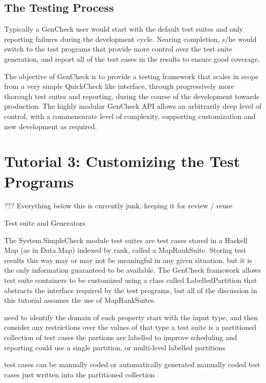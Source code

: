 

\subsection{The Testing Process}
Typically a GenCheck user would start with the default test suites
and only reporting failures during the development cycle.
Nearing completion, s/he would switch to the test programs 
that provide more control over the test suite generation,
and report all of the test cases in the results to ensure good coverage.

The objective of GenCheck is to provide a testing framework that
scales in scope from a very simple QuickCheck like interface,
through progressively more thorough test suites and reporting,
during the course of the development towards production.
The highly modular GenCheck API allows an arbitrarily deep level of control,
with a commensurate level of complexity,
supporting customization and new development as required.




\section{Tutorial 3: Customizing the Test Programs}

??? Everything below this is currently junk, keeping it for review / reuse

Test suite and Generators

The System.SimpleCheck module test suites are test cases stored in 
a Haskell Map (as in Data.Map) indexed by rank, called a MapRankSuite.
Storing test results this way may or may not be meaningful in 
any given situation, but it is the only information guaranteed to be available.
The GenCheck framework allows test suite containers to be customized using
a class called LabelledPartition that abstracts the interface required by the test programs,
but all of the discussion in this tutorial assumes the use of MapRankSuites.

need to identify the domain of each property
start with the input type, and then consider any restrictions over the values of that type
a test suite is a partitioned collection of test cases
  the partions are labelled to improve scheduling and reporting
  could use a single partition, or multi-level labelled partitions

test cases can be manually coded or automatically generated
manually coded test cases just written into the partitioned collection

